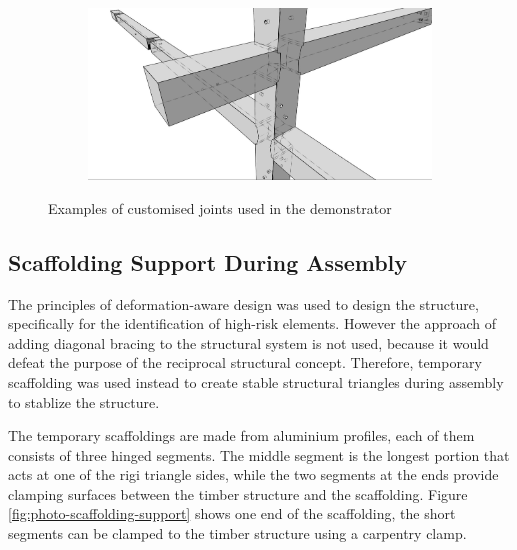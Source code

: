 \begin{figure}[!h]
\begin{subfigure}[b]{0.49\textwidth}
    \end{subfigure}
    \hfill
    \begin{subfigure}[b]{0.49\textwidth}
        \centering
        \includegraphics[width=\textwidth]{images/08/img09.jpg}
    \end{subfigure}
    \caption{Examples of customised joints used in the demonstrator}
    \label{fig:customised-joints}
\end{figure}


\subsection{Scaffolding Support During Assembly}
\label{subsection:exploration-5-scaffolding-support-during-assembly}

The principles of deformation-aware design  was used to design the structure, specifically for the identification of high-risk elements. 
However the approach of adding diagonal bracing to the structural system  is not used, because it would defeat the purpose of the reciprocal structural concept. Therefore, temporary scaffolding was used instead to create stable structural triangles during assembly to stablize the structure. 

The temporary scaffoldings are made from aluminium profiles, each of them consists of three hinged segments. The middle segment is the longest portion that acts at one of the rigi triangle sides, while the two segments at the ends provide clamping surfaces between the timber structure and the scaffolding. Figure \ref{fig:photo-scaffolding-support} shows one end of the scaffolding, the short segments can be clamped to the timber structure using a carpentry clamp.

